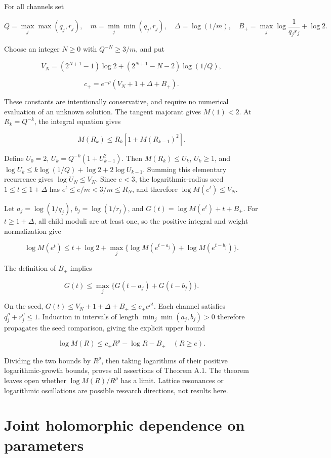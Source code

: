 For all channels set

\[
Q=\max_j\max(q_j,r_j),\quad
m=\min_j\min(q_j,r_j),\quad
\Delta=\log(1/m),\quad
B_+=\max_j\log\frac1{q_jr_j}+\log2.
\]

Choose an integer \(N\ge0\) with \(Q^{-N}\ge3/m\), and put

\[
V_N=(2^{N+1}-1)\log2+
       (2^{N+1}-N-2)\log(1/Q),
\]

\[
c_+=e^{-\rho}(V_N+1+\Delta+B_+).
\]

These constants are intentionally conservative, and require no numerical
evaluation of an unknown solution. The tangent majorant gives
\(M(1)<2\). At \(R_k=Q^{-k}\), the integral equation gives

\[
M(R_k)\le R_k[1+M(R_{k-1})^2].
\]

Define \(U_0=2\), \(U_k=Q^{-k}(1+U_{k-1}^2)\). Then \(M(R_k)\le U_k\),
\(U_k\ge1\), and \(\log U_k\le k\log(1/Q)+\log2+2\log U_{k-1}\). Summing
this elementary recurrence gives \(\log U_N\le V_N\). Since \(e<3\), the
logarithmic-radius seed \(1\le t\le1+\Delta\) has
\(e^t\le e/m<3/m\le R_N\), and therefore \(\log M(e^t)\le V_N\).

Let \(a_j=\log(1/q_j)\), \(b_j=\log(1/r_j)\), and
\(G(t)=\log M(e^t)+t+B_+\). For \(t\ge1+\Delta\), all child moduli are
at least one, so the positive integral and weight normalization give

\[
\log M(e^t)\le t+\log2+
\max_j\{\log M(e^{t-a_j})+\log M(e^{t-b_j})\}.
\]

The definition of \(B_+\) implies

\[
G(t)\le\max_j\{G(t-a_j)+G(t-b_j)\}.
\]

On the seed, \(G(t)\le V_N+1+\Delta+B_+\le c_+e^{\rho t}\). Each channel
satisfies \(q_j^\rho+r_j^\rho\le1\). Induction in intervals of length
\(\min_j\min(a_j,b_j)>0\) therefore propagates the seed comparison,
giving the explicit upper bound

\[
\boxed{\log M(R)\le c_+R^\rho-\log R-B_+\quad(R\ge e).}
\]

Dividing the two bounds by \(R^\rho\), then taking logarithms of their
positive logarithmic-growth bounds, proves all assertions of Theorem A.1.
The theorem leaves open whether \(\log M(R)/R^\rho\) has a limit.
Lattice resonances or logarithmic oscillations are possible research
directions, not results here.

\hypertarget{joint-holomorphic-dependence-on-parameters}{%
\section{Joint holomorphic dependence on
parameters}\label{joint-holomorphic-dependence-on-parameters}}

